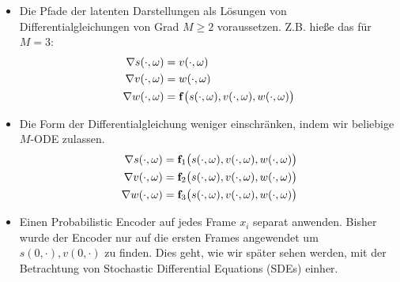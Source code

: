 \documentclass[12pt]{article}
\newcommand{\bbf}{\bold{f}}
\begin{document}
	\begin{itemize}
		\item Die Pfade der latenten Darstellungen als Lösungen von Differentialgleichungen von Grad $M \geq 2$ voraussetzen. Z.B. hieße das für $M=3$:
		\begin{align*}
		\nabla s(\cdot,\omega) &= v(\cdot,\omega)\\
		\nabla v(\cdot,\omega) &= w(\cdot,\omega)\\
		\nabla w(\cdot,\omega) &= \bbf\big(s(\cdot,\omega),v(\cdot,\omega),w(\cdot,\omega)\big)
		\end{align*}

		\item Die Form der Differentialgleichung weniger einschränken, indem wir beliebige $M$-ODE zulassen.
		\begin{align*}
		\nabla s(\cdot,\omega) &= \bbf_1\big(s(\cdot,\omega),v(\cdot,\omega),w(\cdot,\omega)\big)\\
		\nabla v(\cdot,\omega) &= \bbf_2\big(s(\cdot,\omega),v(\cdot,\omega),w(\cdot,\omega)\big)\\
		\nabla w(\cdot,\omega) &= \bbf_3\big(s(\cdot,\omega),v(\cdot,\omega),w(\cdot,\omega)\big)
		\end{align*}

		\item Einen Probabilistic Encoder auf jedes Frame $x_i$ separat anwenden. Bisher wurde der Encoder nur auf die ersten Frames angewendet um $s(0,\cdot), v(0,\cdot)$ zu finden. Dies geht, wie wir später sehen werden, mit der Betrachtung von Stochastic Differential Equations (SDEs) einher.
	\end{itemize}

	\newpage
\end{document}
